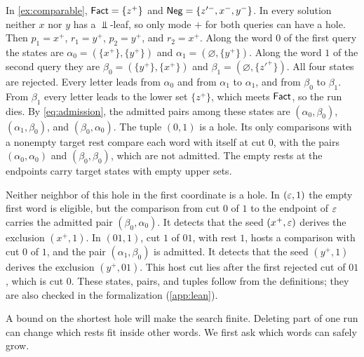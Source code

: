 \begin{example}\label{ex:comparable-reader}
In \cref{ex:comparable}, $\mathsf{Fact}=\{z^+\}$ and $\mathsf{Neg}=\{z'^-,x^-,y^-\}$.
In every solution neither $x$ nor $y$ has a $\Bot$-leaf, so only mode $+$
for both queries can have a hole. Then $p_1=x^+$, $r_1=y^+$, $p_2=y^+$,
and $r_2=x^+$. Along the word $0$ of the first query the states are
$\alpha_0=(\{x^+\},\{y^+\})$ and $\alpha_1=(\varnothing,\{y^+\})$. Along
the word $1$ of the second query they are $\beta_0=(\{y^+\},\{x^+\})$ and
$\beta_1=(\varnothing,\{z'^+\})$. All four states are rejected. Every
letter leads from $\alpha_0$ and from $\alpha_1$ to $\alpha_1$, and from
$\beta_0$ to $\beta_1$. From $\beta_1$ every letter leads to the lower set
$\{z^+\}$, which meets $\mathsf{Fact}$, so the run dies. By \eqref{eq:admission},
the admitted pairs among these states are $(\alpha_0,\beta_0)$,
$(\alpha_1,\beta_0)$, and $(\beta_0,\alpha_0)$. The tuple $(0,1)$ is a hole.
Its only comparisons with a nonempty target rest compare each word with
itself at cut $0$, with the pairs $(\alpha_0,\alpha_0)$ and
$(\beta_0,\beta_0)$, which are not admitted. The empty rests at the
endpoints carry target states with empty upper sets.

Neither neighbor of this hole in the first coordinate is a hole. In
$(\varepsilon,1)$ the empty first word is eligible, but the comparison from cut
$0$ of $1$ to the endpoint of $\varepsilon$ carries the admitted pair
$(\beta_0,\alpha_0)$. It detects that the seed $(x^+,\varepsilon)$ derives the
exclusion $(x^+,1)$. In $(01,1)$, cut $1$ of $01$, with rest $1$, hosts a
comparison with cut $0$ of $1$, and the pair $(\alpha_1,\beta_0)$ is
admitted. It detects that the seed $(y^+,1)$ derives the exclusion
$(y^+,01)$. This host cut lies after the first rejected cut of $01$, which
is cut $0$. These states, pairs, and tuples follow from the definitions;
they are also checked in the formalization (\cref{app:lean}).
\end{example}

A bound on the shortest hole will make the search finite. Deleting part
of one run can change which rests fit inside other words. We first
ask which words can safely grow.
